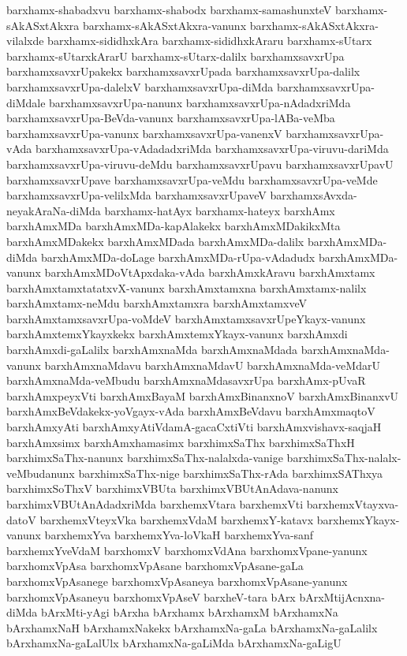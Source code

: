 {barxhamx-shabadxvu
barxhamx-shabodx
barxhamx-samashunxteV
barxhamx-sAkASxtAkxra
barxhamx-sAkASxtAkxra-vanunx
barxhamx-sAkASxtAkxra-vilalxde
barxhamx-sididhxkAra
barxhamx-sididhxkAraru
barxhamx-sUtarx
barxhamx-sUtarxkArarU
barxhamx-sUtarx-dalilx
barxhamxsavxrUpa
barxhamxsavxrUpakekx
barxhamxsavxrUpada
barxhamxsavxrUpa-dalilx
barxhamxsavxrUpa-dalelxV
barxhamxsavxrUpa-diMda
barxhamxsavxrUpa-diMdale
barxhamxsavxrUpa-nanunx
barxhamxsavxrUpa-nAdadxriMda
barxhamxsavxrUpa-BeVda-vanunx
barxhamxsavxrUpa-lABa-veMba
barxhamxsavxrUpa-vanunx
barxhamxsavxrUpa-vanenxV
barxhamxsavxrUpa-vAda
barxhamxsavxrUpa-vAdadadxriMda
barxhamxsavxrUpa-viruvu-dariMda
barxhamxsavxrUpa-viruvu-deMdu
barxhamxsavxrUpavu
barxhamxsavxrUpavU
barxhamxsavxrUpave
barxhamxsavxrUpa-veMdu
barxhamxsavxrUpa-veMde
barxhamxsavxrUpa-velilxMda
barxhamxsavxrUpaveV
barxhamxsAvxda-neyakAraNa-diMda
barxhamx-hatAyx
barxhamx-hateyx
barxhAmx
barxhAmxMDa
barxhAmxMDa-kapAlakekx
barxhAmxMDakikxMta
barxhAmxMDakekx
barxhAmxMDada
barxhAmxMDa-dalilx
barxhAmxMDa-diMda
barxhAmxMDa-doLage
barxhAmxMDa-rUpa-vAdadudx
barxhAmxMDa-vanunx
barxhAmxMDoVtApxdaka-vAda
barxhAmxkAravu
barxhAmxtamx
barxhAmxtamxtatatxvX-vanunx
barxhAmxtamxna
barxhAmxtamx-nalilx
barxhAmxtamx-neMdu
barxhAmxtamxra
barxhAmxtamxveV
barxhAmxtamxsavxrUpa-voMdeV
barxhAmxtamxsavxrUpeYkayx-vanunx
barxhAmxtemxYkayxkekx
barxhAmxtemxYkayx-vanunx
barxhAmxdi
barxhAmxdi-gaLalilx
barxhAmxnaMda
barxhAmxnaMdada
barxhAmxnaMda-vanunx
barxhAmxnaMdavu
barxhAmxnaMdavU
barxhAmxnaMda-veMdarU
barxhAmxnaMda-veMbudu
barxhAmxnaMdasavxrUpa
barxhAmx-pUvaR
barxhAmxpeyxVti
barxhAmxBayaM
barxhAmxBinanxnoV
barxhAmxBinanxvU
barxhAmxBeVdakekx-yoVgayx-vAda
barxhAmxBeVdavu
barxhAmxmaqtoV
barxhAmxyAti
barxhAmxyAtiVdamA-gacaCxtiVti
barxhAmxvishavx-saqjaH
barxhAmxsimx
barxhAmxhamasimx
barxhimxSaThx
barxhimxSaThxH
barxhimxSaThx-nanunx
barxhimxSaThx-nalalxda-vanige
barxhimxSaThx-nalalx-veMbudanunx
barxhimxSaThx-nige
barxhimxSaThx-rAda
barxhimxSAThxya
barxhimxSoThxV
barxhimxVBUta
barxhimxVBUtAnAdava-nanunx
barxhimxVBUtAnAdadxriMda
barxhemxVtara
barxhemxVti
barxhemxVtayxva-datoV
barxhemxVteyxVka
barxhemxVdaM
barxhemxY-katavx
barxhemxYkayx-vanunx
barxhemxYva
barxhemxYva-loVkaH
barxhemxYva-sanf
barxhemxYveVdaM
barxhomxV
barxhomxVdAna
barxhomxVpane-yanunx
barxhomxVpAsa
barxhomxVpAsane
barxhomxVpAsane-gaLa
barxhomxVpAsanege
barxhomxVpAsaneya
barxhomxVpAsane-yanunx
barxhomxVpAsaneyu
barxhomxVpAseV
barxheV-tara
bArx
bArxMtijAcnxna-diMda
bArxMti-yAgi
bArxha
bArxhamx
bArxhamxM
bArxhamxNa
bArxhamxNaH
bArxhamxNakekx
bArxhamxNa-gaLa
bArxhamxNa-gaLalilx
bArxhamxNa-gaLalUlx
bArxhamxNa-gaLiMda
bArxhamxNa-gaLigU
}
